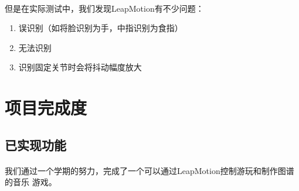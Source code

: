 \documentclass{article}
\begin{document}
\paragraph{}
但是在实际测试中，我们发现LeapMotion有不少问题：
\begin{enumerate}
  \item 误识别（如将脸识别为手，中指识别为食指）
  \item 无法识别
  \item 识别固定关节时会将抖动幅度放大
\end{enumerate}
\section{项目完成度}
\subsection{已实现功能}
\paragraph{}
我们通过一个学期的努力，完成了一个可以通过LeapMotion控制游玩和制作图谱的音乐
游戏。
\end{document}
